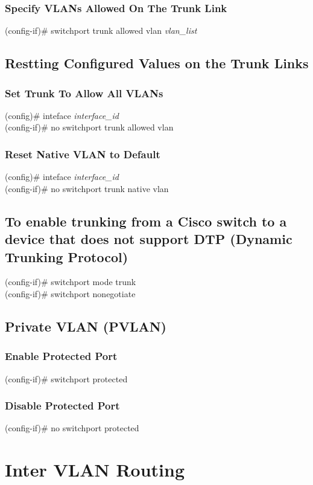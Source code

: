 \subsubsection*{Specify VLANs Allowed On The Trunk Link}
(config-if)\# switchport trunk allowed vlan \textit{vlan\_list}

\subsection{Restting Configured Values on the Trunk Links}
\subsubsection*{Set Trunk To Allow All VLANs}
(config)\# inteface \textit{interface\_id}\\
(config-if)\# no switchport trunk allowed vlan
\subsubsection*{Reset Native VLAN to Default}
(config)\# inteface \textit{interface\_id}\\
(config-if)\# no switchport trunk native vlan

\subsection{To enable trunking from a Cisco switch to a device that does not support DTP (Dynamic Trunking Protocol)}
(config-if)\# switchport mode trunk\\
(config-if)\# switchport nonegotiate

\subsection{Private VLAN (PVLAN)}
\subsubsection*{Enable Protected Port}
(config-if)\# switchport protected
\subsubsection*{Disable Protected Port}
(config-if)\# no switchport protected

\section{Inter VLAN Routing}

